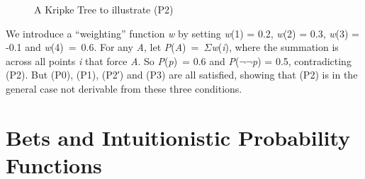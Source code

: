 \documentclass[
  10pt,
  letterpaper,
  DIV=11,
  numbers=noendperiod,
  twoside]{scrartcl}
\begin{document}
\begin{figure}


\caption{\label{fig-kripke}A Kripke Tree to illustrate (P2)}

\end{figure}%

We introduce a ``weighting'' function \emph{w} by setting \emph{w}(1) =
0.2, \emph{w}(2) = 0.3, \emph{w}(3) = -0.1 and \emph{w}(4)~=~0.6. For
any \emph{A}, let \emph{P}(\emph{A})~=~\({\Sigma}\)\emph{w}(\emph{i}),
where the summation is across all points \emph{i} that force \emph{A}.
So \emph{P}(\emph{p})~= 0.6 and \emph{P}(\({\lnot}{\lnot}\)\emph{p}) =
0.5, contradicting (P2). But (P0), (P1), (P2′) and (P3) are all
satisfied, showing that (P2) is in the general case not derivable from
these three conditions.

\section{Bets and Intuitionistic Probability
Functions}\label{bets-and-intuitionistic-probability-functions}
\end{document}
